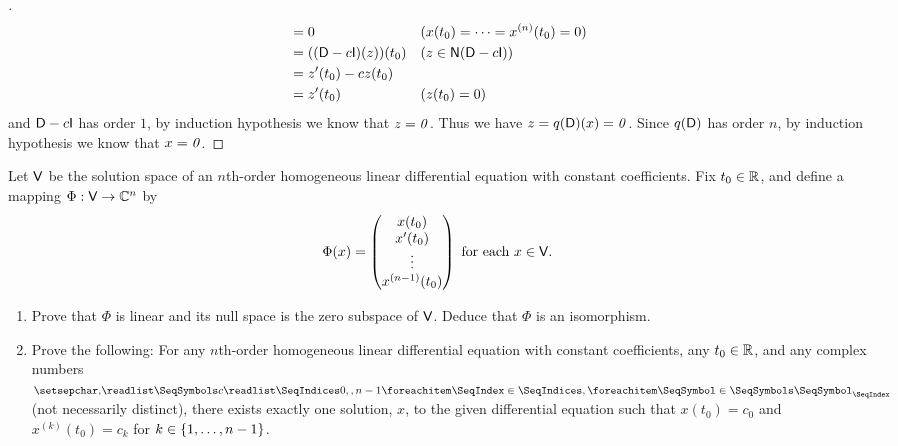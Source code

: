 \begin{proof}[]
\begin{align*}
		       & = 0                        &  & (x(t_0) = \cdots = x^{(n)}(t_0) = 0) \\
		       & = ((\Dop - c \IT)(z))(t_0) &  & (z \in \ns{\Dop - c \IT})            \\
		       & = z'(t_0) - c z(t_0)                                                 \\
		       & = z'(t_0)                  &  & (z(t_0) = 0)
	\end{align*}
	and \(\Dop - c \IT\) has order \(1\), by induction hypothesis we know that \(z = \mathit{0}\).
	Thus we have \(z = q(\mathsf{D})(x) = \mathit{0}\).
	Since \(q(\mathsf{D})\) has order \(n\), by induction hypothesis we know that \(x = \mathit{0}\).
\end{proof}

\begin{ex}\label{ex:2.7.15}
	Let \(\mathsf{V}\) be the solution space of an \(n\)th-order homogeneous linear differential equation with constant coefficients.
	Fix \(t_0 \in \mathbb{R}\), and define a mapping \(\Phi : \mathsf{V} \to \mathbb{C}^n\) by
	\[
		\Phi(x) = \begin{pmatrix}
			x(t_0)  \\
			x'(t_0) \\
			\vdots  \\
			x^{(n - 1)}(t_0)
		\end{pmatrix} \text{ for each } x \in \mathsf{V}.
	\]
	\begin{enumerate}
		\item Prove that \(\Phi\) is linear and its null space is the zero subspace of \(\mathsf{V}\).
		      Deduce that \(\Phi\) is an isomorphism.
		\item Prove the following:
		      For any \(n\)th-order homogeneous linear differential equation with constant coefficients, any \(t_0 \in \mathbb{R}\), and any complex numbers \(\seq{c}{0,,n-1}\) (not necessarily distinct), there exists exactly one solution, \(x\), to the given differential equation such that \(x(t_0) = c_0\) and \(x^{(k)}(t_0) = c_k\) for \(k \in \left\lbrace1, \dots, n - 1\right\rbrace\).
	\end{enumerate}
\end{ex}


